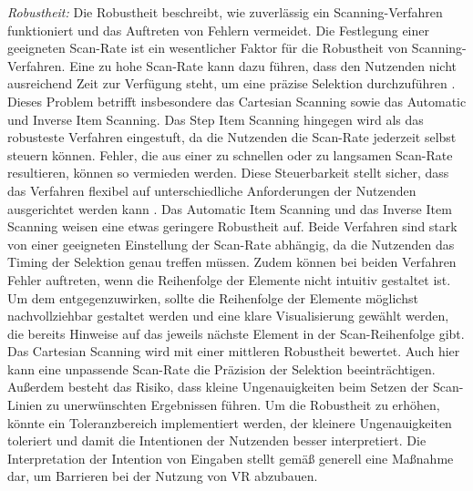 \textit{Robustheit:}
Die Robustheit beschreibt, wie zuverlässig ein Scanning-Verfahren funktioniert und das Auftreten von Fehlern vermeidet. Die Festlegung einer geeigneten Scan-Rate ist ein wesentlicher Faktor für die Robustheit von Scanning-Verfahren. Eine zu hohe Scan-Rate kann dazu führen, dass den Nutzenden nicht ausreichend Zeit zur Verfügung steht, um eine präzise Selektion durchzuführen \citep{COOK2015117}. Dieses Problem betrifft insbesondere das Cartesian Scanning sowie das Automatic und Inverse Item Scanning. Das Step Item Scanning hingegen wird als das robusteste Verfahren eingestuft, da die Nutzenden die Scan-Rate jederzeit selbst steuern können. Fehler, die aus einer zu schnellen oder zu langsamen Scan-Rate resultieren, können so vermieden werden. Diese Steuerbarkeit stellt sicher, dass das Verfahren flexibel auf unterschiedliche Anforderungen der Nutzenden ausgerichtet werden kann \citep{COOK2015117}.
Das Automatic Item Scanning und das Inverse Item Scanning weisen eine etwas geringere Robustheit auf. Beide Verfahren sind stark von einer geeigneten Einstellung der Scan-Rate abhängig, da die Nutzenden das Timing der Selektion genau treffen müssen. Zudem können bei beiden Verfahren Fehler auftreten, wenn die Reihenfolge der Elemente nicht intuitiv gestaltet ist. Um dem entgegenzuwirken, sollte die Reihenfolge der Elemente möglichst nachvollziehbar gestaltet werden und eine klare Visualisierung gewählt werden, die bereits Hinweise auf das jeweils nächste Element in der Scan-Reihenfolge gibt.
Das Cartesian Scanning wird mit einer mittleren Robustheit bewertet. Auch hier kann eine unpassende Scan-Rate die Präzision der Selektion beeinträchtigen. Außerdem besteht das Risiko, dass kleine Ungenauigkeiten beim Setzen der Scan-Linien zu unerwünschten Ergebnissen führen. Um die Robustheit zu erhöhen, könnte ein Toleranzbereich implementiert werden, der kleinere Ungenauigkeiten toleriert und damit die Intentionen der Nutzenden besser interpretiert. Die Interpretation der Intention von Eingaben stellt gemäß \citet{dombrowski_designing_2019} generell eine Maßnahme dar, um Barrieren bei der Nutzung von VR abzubauen. 

